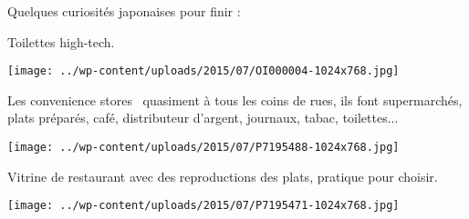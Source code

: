  Quelques curiosités japonaises pour finir :

 Toilettes high-tech.
\begin{center} \texttt{[image: ../wp-content/uploads/2015/07/OI000004-1024x768.jpg]} \end{center}

 Les \og convenience stores \fg\ quasiment à tous les coins de rues, ils font supermarchés, plats préparés, café, distributeur d'argent, journaux, tabac, toilettes...
\begin{center} \texttt{[image: ../wp-content/uploads/2015/07/P7195488-1024x768.jpg]} \end{center}

 Vitrine de restaurant avec des reproductions des plats, pratique pour choisir. 
\begin{center} \texttt{[image: ../wp-content/uploads/2015/07/P7195471-1024x768.jpg]} \end{center}
